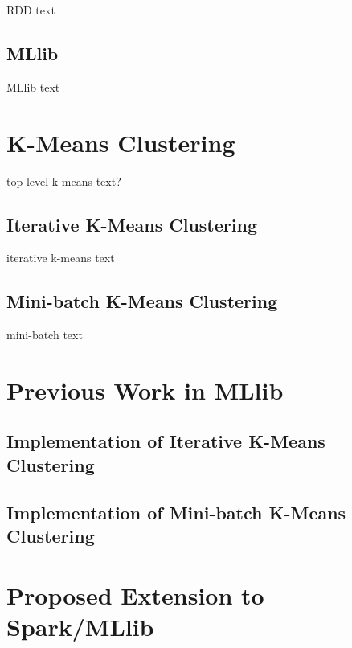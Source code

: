 \documentclass{l4proj}
\begin{document}
RDD text

\section{MLlib}

MLlib text


\chapter{K-Means Clustering}
\label{kmeans}

top level k-means text?

\section{Iterative K-Means Clustering}

iterative k-means text

\section{Mini-batch K-Means Clustering}

mini-batch text


\chapter{Previous Work in MLlib}
\label{previous}

\section{Implementation of Iterative K-Means Clustering}

\section{Implementation of Mini-batch K-Means Clustering}


\chapter{Proposed Extension to Spark/MLlib}
\label{propose}
\end{document}

